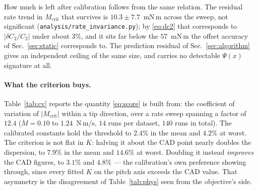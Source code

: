 \documentclass[10pt]{article}
\begin{document}
How much is left after calibration follows from the same relation. The
residual rate trend in $M_{\mathrm{crit}}$ that survives is
$10.3 \pm 7.7$~mN\,m across the sweep, not significant
(\texttt{analysis/rate\_invariance.py}); by \eqref{eq:dc2} that
corresponds to $|\delta C_2/C_2|$ under about $3\%$, and it sits far
below the $57$~mN\,m the offset accuracy of Sec.~\ref{sec:static}
corresponds to. The prediction residual of Sec.~\ref{sec:algorithm}
gives an independent ceiling of the same size, and carries no detectable
$\Psi(x)$ signature at all.

\paragraph{What the criterion buys.}
Table~\ref{tab:cv} reports the quantity \eqref{eq:score} is built from:
the coefficient of variation of $|M_{\mathrm{crit}}|$ within a tip
direction, over a rate sweep spanning a factor of $12.4$
($\dot M = 0.10$ to $1.24$~N\,m/s, $14$ runs per dataset, $140$ runs in
total). The calibrated constants hold the threshold to $2.4\%$ in the
mean and $4.2\%$ at worst. The criterion is not flat in $K$: halving it
about the CAD point nearly doubles the dispersion, to $7.9\%$ in the
mean and $14.6\%$ at worst. Doubling it instead \emph{improves} the
CAD figures, to $3.1\%$ and $4.8\%$ --- the calibration's own
preference showing through, since every fitted $K$ on the pitch axis
exceeds the CAD value. That asymmetry is the disagreement of
Table~\ref{tab:phys} seen from the objective's side.
\end{document}
